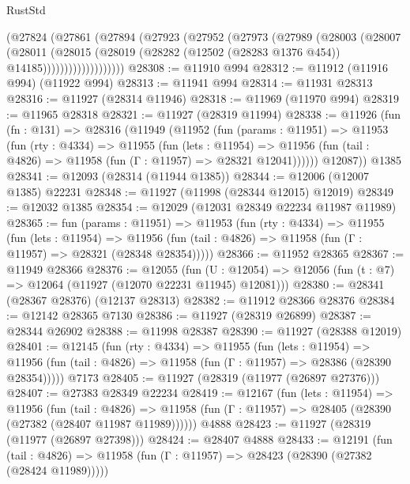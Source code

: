 \begin{lexlean}{RustStd}
\begin{coremodule}
                (@27824
                  (@27861
                    (@27894
                      (@27923
                        (@27952
                          (@27973
                            (@27989
                              (@28003
                                (@28007
                                  (@28011
                                    (@28015
                                      (@28019
                                        (@28282
                                          (@12502 (@28283 @1376 @454))
                                          @14185)))))))))))))))))))
@28308 := @11910 @994
@28312 := @11912 (@11916 @994) (@11922 @994)
@28313 := @11941 @994
@28314 := @11931 @28313
@28316 := @11927 (@28314 @11946)
@28318 := @11969 (@11970 @994)
@28319 := @11965 @28318
@28321 := @11927 (@28319 @11994)
@28338 := @11926
    (fun (fn : @131) =>
    @28316
      (@11949
        (@11952
          (fun (params : @11951) =>
          @11953
            (fun (rty : @4334) =>
            @11955
              (fun (lets : @11954) =>
              @11956 (fun (tail : @4826) => @11958 (fun (Γ : @11957) => @28321 @12041))))))
        @12087))
    @1385
@28341 := @12093 (@28314 (@11944 @1385))
@28344 := @12006 (@12007 @1385) @22231
@28348 := @11927 (@11998 (@28344 @12015) @12019)
@28349 := @12032 @1385
@28354 := @12029 (@12031 @28349 @22234 @11987 @11989)
@28365 := fun (params : @11951) =>
  @11953
    (fun (rty : @4334) =>
    @11955
      (fun (lets : @11954) =>
      @11956 (fun (tail : @4826) => @11958 (fun (Γ : @11957) => @28321 (@28348 @28354)))))
@28366 := @11952 @28365
@28367 := @11949 @28366
@28376 := @12055
    (fun (U : @12054) => @12056 (fun (t : @7) => @12064 (@11927 (@12070 @22231 @11945) @12081)))
@28380 := @28341 (@28367 @28376) (@12137 @28313)
@28382 := @11912 @28366 @28376
@28384 := @12142 @28365 @7130
@28386 := @11927 (@28319 @26899)
@28387 := @28344 @26902
@28388 := @11998 @28387
@28390 := @11927 (@28388 @12019)
@28401 := @12145
    (fun (rty : @4334) =>
    @11955
      (fun (lets : @11954) =>
      @11956 (fun (tail : @4826) => @11958 (fun (Γ : @11957) => @28386 (@28390 @28354)))))
    @7173
@28405 := @11927 (@28319 (@11977 (@26897 @27376)))
@28407 := @27383 @28349 @22234
@28419 := @12167
    (fun (lets : @11954) =>
    @11956
      (fun (tail : @4826) =>
      @11958 (fun (Γ : @11957) => @28405 (@28390 (@27382 (@28407 @11987 @11989))))))
    @4888
@28423 := @11927 (@28319 (@11977 (@26897 @27398)))
@28424 := @28407 @4888
@28433 := @12191
    (fun (tail : @4826) => @11958 (fun (Γ : @11957) => @28423 (@28390 (@27382 (@28424 @11989)))))

\end{coremodule}
\end{lexlean}
